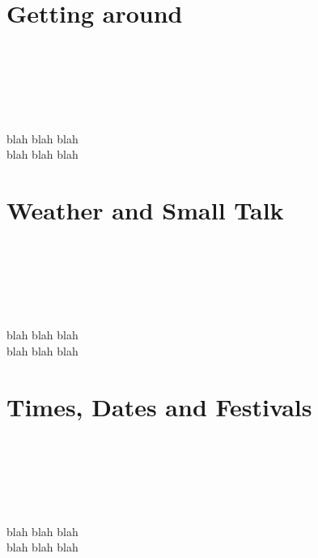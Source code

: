 \section*{Getting around}
\begin{multicols}{2}
\huge{\color{wordColor}{English}}\\
\Large

\\

\\

\columnbreak 
\huge{\@title}\\
\Large

{blah blah blah}\\

{blah blah blah}\\

\end{multicols}

\section*{Weather and Small Talk}
\begin{multicols}{2}
\huge{\color{wordColor}{English}}\\
\Large

\\

\\

\columnbreak 
\huge{\@title}\\
\Large

{blah blah blah}\\

{blah blah blah}\\

\end{multicols}

\section*{Times, Dates and Festivals}
\begin{multicols}{2}
\huge{\color{wordColor}{English}}\\
\Large

\\

\\

\columnbreak 
\huge{\@title}\\
\Large

{blah blah blah}\\

{blah blah blah}\\

\end{multicols}
